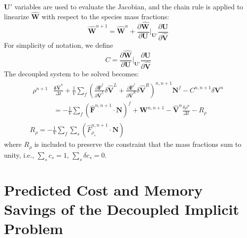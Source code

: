 $\mathbf{U}'$ variables are used to evaluate the Jacobian, and the chain rule is
applied to linearize $\mathbf{\hat{W}}$ with respect to the species mass
fractions:
\begin{equation}
  \mathbf{\hat{W}}^{n+1} = \mathbf{\hat{W}}^n+\frac{\partial
  \mathbf{\hat{W}}}{\partial \mathbf{U}}\bigg|_{\mathbf{U}'} \frac{\partial
  \mathbf{U}}{\partial \mathbf{\hat{V}}} 
\end{equation}
For simplicity of notation, we define
\begin{equation}
  C = \frac{\partial \mathbf{\hat{W}}}{\partial
  \mathbf{U}}\bigg|_{\mathbf{U}'} \frac{\partial \mathbf{U}}{\partial
  \mathbf{\hat{V}}}
\end{equation}
The decoupled system to be solved becomes:
\begin{gather} 
  \begin{split}
    \rho^{n+1}&\frac{\mathbf{\delta \hat{V}}^n}{\Delta t}
    +\frac{1}{V}\sum\limits_{f}(\frac{\partial \mathbf{\hat{F}}^f}{\partial
    \mathbf{\hat{V}}^L}\delta	\mathbf{\hat{V}}^L
    +\frac{\partial \mathbf{\hat{F}}^f}{\partial \mathbf{\hat{V}}^R}\delta
    \mathbf{\hat{V}}^R)^{n, n+1}\mathbf{N}^f - C^{n, n+1}\delta\mathbf{V}^n \\
    &= -\frac{1}{V}\sum\limits_{f}(\mathbf{\hat{F}}^{n,n+1}\cdot\mathbf{N})^f +
    \mathbf{W}^{n, n+1} -\mathbf{\hat{V}}^n\frac{\delta \rho^n}{\Delta t} -
    R_\rho
  \end{split} \\ 
  R_\rho = -\frac{1}{V}\sum\limits_{f}{\sum\limits_{s}
  {(\hat{F}_{\rho_s}^{n,n+1}\cdot\mathbf{N})}}
\end{gather}
where $R_\rho$ is included to preserve the constraint that the mass fractions
sum to unity, i.e., $\sum\limits_{s}{c_s}=1$, $\sum\limits_{s}{\delta
c_s}=0$.

\section{Predicted Cost and Memory Savings of the Decoupled Implicit Problem}

